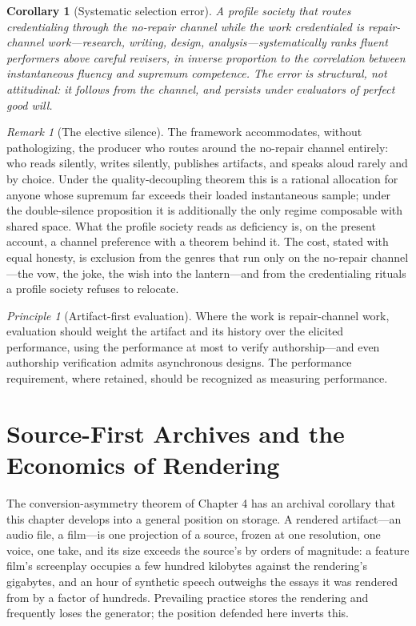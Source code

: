 \documentclass[11pt,oneside]{book}
\theoremstyle{plain}
\newtheorem{corollary}[theorem]{Corollary}
\theoremstyle{definition}
\theoremstyle{remark}
\newtheorem{remark}[theorem]{Remark}
\newtheorem{principle}[theorem]{Principle}
\begin{document}
\begin{corollary}[Systematic selection error]
A profile society that routes credentialing through the no-repair channel while the work credentialed is repair-channel work---research, writing, design, analysis---systematically ranks fluent performers above careful revisers, in inverse proportion to the correlation between instantaneous fluency and supremum competence. The error is structural, not attitudinal: it follows from the channel, and persists under evaluators of perfect good will.
\end{corollary}

\begin{remark}[The elective silence]
The framework accommodates, without pathologizing, the producer who routes around the no-repair channel entirely: who reads silently, writes silently, publishes artifacts, and speaks aloud rarely and by choice. Under the quality-decoupling theorem this is a rational allocation for anyone whose supremum far exceeds their loaded instantaneous sample; under the double-silence proposition it is additionally the only regime composable with shared space. What the profile society reads as deficiency is, on the present account, a channel preference with a theorem behind it. The cost, stated with equal honesty, is exclusion from the genres that run only on the no-repair channel---the vow, the joke, the wish into the lantern---and from the credentialing rituals a profile society refuses to relocate.
\end{remark}

\begin{principle}[Artifact-first evaluation]
Where the work is repair-channel work, evaluation should weight the artifact and its history over the elicited performance, using the performance at most to verify authorship---and even authorship verification admits asynchronous designs. The performance requirement, where retained, should be recognized as measuring performance.
\end{principle}

\chapter{Source-First Archives and the Economics of Rendering}

The conversion-asymmetry theorem of Chapter 4 has an archival corollary that this chapter develops into a general position on storage. A rendered artifact---an audio file, a film---is one projection of a source, frozen at one resolution, one voice, one take, and its size exceeds the source's by orders of magnitude: a feature film's screenplay occupies a few hundred kilobytes against the rendering's gigabytes, and an hour of synthetic speech outweighs the essays it was rendered from by a factor of hundreds. Prevailing practice stores the rendering and frequently loses the generator; the position defended here inverts this.
\end{document}
